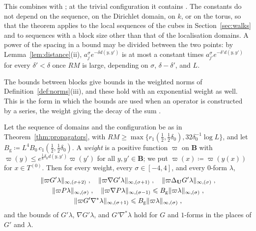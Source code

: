 \documentclass[11pt]{preprint}
\DeclarePairedDelimiter{\norm}{\lVert}{\rVert}
\numberwithin{equation}{section}
\begin{document}
This combines \cite[Theorems~3.1--3.4, Corollaries~3.5, 3.6, pp.~397--408]{BalabanPBG} with \cite[(3.48), (3.49)]{BalabanPBG}; at the trivial configuration it contains \cite[Propositions~2.2, 2.3, 2.6]{BalabanPRT2}. The constants do not depend on the sequence, on the Dirichlet domain, on $k$, or on the torus, so that the theorem applies to the local sequences of the cubes in Section~\ref{sec:walks} and to sequences with a block size other than that of the localisation domains. A power of the spacing in a bound may be divided between the two points: by Lemma~\ref{lem:distance}(ii), $a_j^\sigma e^{-\delta d(y, y')}$ is at most a constant times $a_{j'}^\sigma e^{-\delta'd(y, y')}$ for every $\delta' < \delta$ once $RM$ is large, depending on $\sigma$, $\delta - \delta'$, and $L$.

The bounds between blocks give bounds in the weighted norms of Definition~\ref{def:norms}(iii), and these hold with an exponential weight as well. This is the form in which the bounds are used when an operator is constructed by a series, the weight giving the decay of the sum \cite[(3.47), p.~398]{BalabanPBG}.

\begin{lemma}\label{lem:global-bounds}
Let the sequence of domains and the configuration be as in Theorem~\ref{thm:propagators}, with $RM \geqslant \max\{ r_1(\frac{1}{2}, \frac{1}{2}\delta_0), 32\delta_0^{-1}\log L \}$, and let $B_{\mathrm g} \coloneqq L^4B_0\,c_1(\frac{1}{2}, \frac{1}{2}\delta_0)$. A \emph{weight} is a positive function $\varpi$ on $\mathbf B$ with $\varpi(y) \leqslant e^{\frac{1}{8}\delta_0d(y, y')}\varpi(y')$ for all $y, y' \in \mathbf B$; we put $\varpi(x) \coloneqq \varpi(y(x))$ for $x \in T^{(0)}$. Then for every weight, every $\sigma \in [-4, 4]$, and every $0$-form $\lambda$,
\begin{equation}\label{eq:global-bounds}
\begin{gathered}
    \norm{\varpi G'\lambda}_{\infty,(\sigma+2)}\;,\quad
    \norm{\varpi\nabla G'\lambda}_{\infty,(\sigma+1)}\;,\quad
    \norm{\varpi\Delta_{\mathbf U}G'\lambda}_{\infty,(\sigma)}\;,\\
    \norm{\varpi P\lambda}_{\infty,(\sigma)}\;,\quad
    \norm{\varpi\nabla P\lambda}_{\infty,(\sigma-1)} \leqslant B_{\mathrm g}\norm{\varpi\lambda}_{\infty,(\sigma)}\;,\\
    \norm{\varpi G'\nabla^*\lambda}_{\infty,(\sigma+1)} \leqslant B_{\mathrm g}\norm{\varpi\lambda}_{\infty,(\sigma)}\;,
\end{gathered}
\end{equation}
and the bounds of $G'\lambda$, $\nabla G'\lambda$, and $G'\nabla^*\lambda$ hold for $G$ and $1$-forms in the places of $G'$ and $\lambda$.
\end{lemma}
\end{document}
